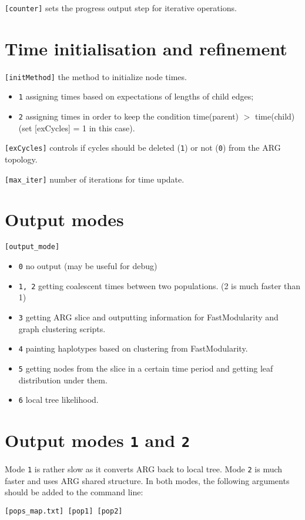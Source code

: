 \documentclass[11pt]{amsart}
\theoremstyle{definition}
\theoremstyle{remark}
\begin{document}
	\texttt{[counter]} sets the progress output step for iterative operations.

\section{Time initialisation and refinement}
	\texttt{[initMethod]} the method to initialize node times.
	\begin{itemize}
		\item \texttt{1} assigning times based on expectations of lengths of child edges;
		\item \texttt{2} assigning times in order to keep the condition time(parent) $>$ time(child) (set [exCycles] = 1 in this case).
	\end{itemize}
	
	\texttt{[exCycles]} controls if cycles should be deleted (\texttt{1}) or not (\texttt{0}) from the ARG topology.
	
	\texttt{[max\_iter]} number of iterations for time update.
	
\section{Output modes}

	\texttt{[output\_mode]}
	\begin{itemize}
		\item \texttt{0} no output (may be useful for debug)
		\item \texttt{1, 2} getting coalescent times between two populations. (2 is much faster than 1)
		\item \texttt{3} getting ARG slice and outputting information for FastModularity and graph clustering scripts.
		\item \texttt{4} painting haplotypes based on clustering from FastModularity.
		\item \texttt{5} getting nodes from the slice in a certain time period and getting leaf distribution under them.
		\item \texttt{6} local tree likelihood.
	\end{itemize}

\section{Output modes \texttt{1} and \texttt{2} }
	Mode \texttt{1} is rather slow as it converts ARG back to local tree. Mode \texttt{2} is much faster and uses ARG shared structure. In both modes, the following arguments should be added to the command line:
	\begin{displayquote}
		\texttt{[pops\_map.txt] [pop1] [pop2]}
	\end{displayquote}
	
\end{document}
